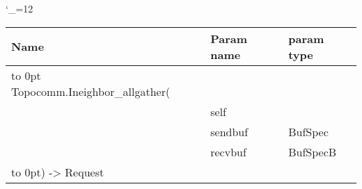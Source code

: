 \begingroup \catcode`\_=12 \tt
\begin{tabular}{lll}
\toprule
\textrm{Name}&\textrm{Param name}&\textrm{param type}\\
\midrule
\hbox to 0pt {Topocomm.Ineighbor_allgather(\hss}\\
& self\\
& sendbuf & BufSpec\\
& recvbuf & BufSpecB\\
\hbox to 0pt{) -> Request\hss}\\
\bottomrule
\end{tabular}
\endgroup

